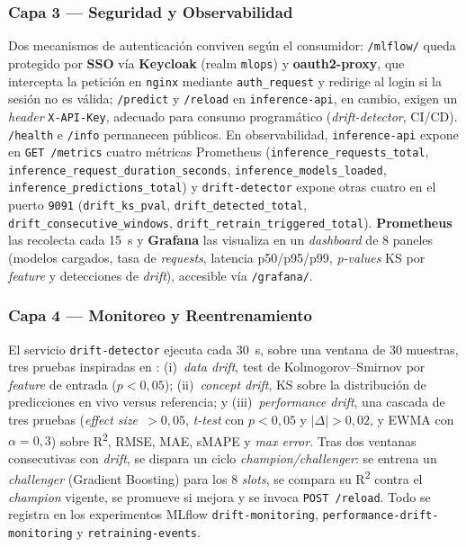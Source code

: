 \documentclass[conference]{IEEEtran}
\begin{document}
\subsubsection{Capa 3 — Seguridad y Observabilidad}
Dos mecanismos de autenticación conviven según el consumidor: \texttt{/mlflow/} queda protegido por \textbf{SSO} vía \textbf{Keycloak} (realm \texttt{mlops}) y \textbf{oauth2-proxy}, que intercepta la petición en \texttt{nginx} mediante \texttt{auth\_request} y redirige al login si la sesión no es válida; \texttt{/predict} y \texttt{/reload} en \texttt{inference-api}, en cambio, exigen un \textit{header} \texttt{X-API-Key}, adecuado para consumo programático (\textit{drift-detector}, CI/CD). \texttt{/health} e \texttt{/info} permanecen públicos. En observabilidad, \texttt{inference-api} expone en \texttt{GET~/metrics} cuatro métricas Prometheus (\texttt{inference\_requests\_total}, \texttt{inference\_request\_duration\_seconds}, \texttt{inference\_models\_loaded}, \texttt{inference\_predictions\_total}) y \texttt{drift-detector} expone otras cuatro en el puerto \texttt{9091} (\texttt{drift\_ks\_pval}, \texttt{drift\_detected\_total}, \texttt{drift\_consecutive\_windows}, \texttt{drift\_retrain\_triggered\_total}). \textbf{Prometheus} las recolecta cada 15~s y \textbf{Grafana} las visualiza en un \textit{dashboard} de 8 paneles (modelos cargados, tasa de \textit{requests}, latencia p50/p95/p99, \textit{p-values} KS por \textit{feature} y detecciones de \textit{drift}), accesible vía \texttt{/grafana/}.

\subsubsection{Capa 4 — Monitoreo y Reentrenamiento}
El servicio \texttt{drift-detector} ejecuta cada 30~s, sobre una ventana de 30 muestras, tres pruebas inspiradas en \cite{autodrift2025}: (i)~\textit{data drift}, test de Kolmogorov--Smirnov por \textit{feature} de entrada ($p<0{,}05$); (ii)~\textit{concept drift}, KS sobre la distribución de predicciones en vivo versus referencia; y (iii)~\textit{performance drift}, una cascada de tres pruebas (\textit{effect size}~$>0{,}05$, \textit{t-test} con $p<0{,}05$ y $|\Delta|>0{,}02$, y EWMA con $\alpha=0{,}3$) sobre R\textsuperscript{2}, RMSE, MAE, sMAPE y \textit{max error}. Tras dos ventanas consecutivas con \textit{drift}, se dispara un ciclo \textit{champion/challenger}: se entrena un \textit{challenger} (Gradient Boosting) para los 8 \textit{slots}, se compara su R\textsuperscript{2} contra el \textit{champion} vigente, se promueve si mejora y se invoca \texttt{POST~/reload}. Todo se registra en los experimentos MLflow \texttt{drift-monitoring}, \texttt{performance-drift-monitoring} y \texttt{retraining-events}.
\end{document}
